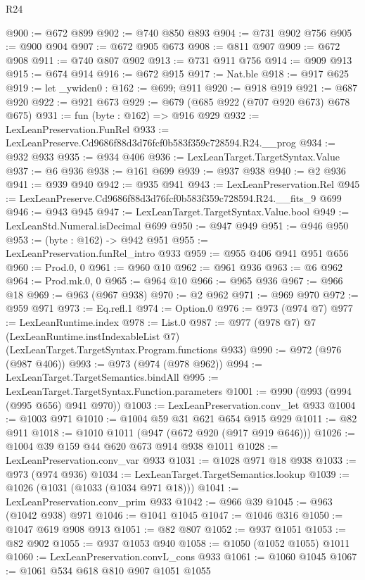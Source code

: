 \begin{lexlean}{R24}
\begin{coremodule}
@900 := @672 @899
@902 := @740 @850 @893
@904 := @731 @902 @756
@905 := @900 @904
@907 := @672 @905 @673
@908 := @811 @907
@909 := @672 @908
@911 := @740 @807 @902
@913 := @731 @911 @756
@914 := @909 @913
@915 := @674 @914
@916 := @672 @915
@917 := Nat.ble
@918 := @917 @625
@919 := let _ywiden0 : @162 := @699; @911
@920 := @918 @919
@921 := @687 @920
@922 := @921 @673
@929 := @679 (@685 @922 (@707 @920 @673) @678 @675)
@931 := fun (byte : @162) => @916 @929
@932 := LexLeanPreservation.FunRel
@933 := LexLeanPreserve.Cd9686f88d3d76fcf0b583f359c728594.R24.__prog
@934 := @932 @933
@935 := @934 @406
@936 := LexLeanTarget.TargetSyntax.Value
@937 := @6 @936
@938 := @161 @699
@939 := @937 @938
@940 := @2 @936
@941 := @939 @940
@942 := @935 @941
@943 := LexLeanPreservation.Rel
@945 := LexLeanPreserve.Cd9686f88d3d76fcf0b583f359c728594.R24.__fits_9 @699
@946 := @943 @945
@947 := LexLeanTarget.TargetSyntax.Value.bool
@949 := LexLeanStd.Numeral.isDecimal @699
@950 := @947 @949
@951 := @946 @950
@953 := (byte : @162) -> @942 @951
@955 := LexLeanPreservation.funRel_intro @933
@959 := @955 @406 @941 @951 @656
@960 := Prod.{0, 0}
@961 := @960 @10
@962 := @961 @936
@963 := @6 @962
@964 := Prod.mk.{0, 0}
@965 := @964 @10
@966 := @965 @936
@967 := @966 @18
@969 := @963 (@967 @938)
@970 := @2 @962
@971 := @969 @970
@972 := @959 @971
@973 := Eq.refl.{1}
@974 := Option.{0}
@976 := @973 (@974 @7)
@977 := LexLeanRuntime.index
@978 := List.{0}
@987 := @977
    (@978 @7)
    @7
    (LexLeanRuntime.instIndexableList @7)
    (LexLeanTarget.TargetSyntax.Program.functions @933)
@990 := @972 (@976 (@987 @406))
@993 := @973 (@974 (@978 @962))
@994 := LexLeanTarget.TargetSemantics.bindAll
@995 := LexLeanTarget.TargetSyntax.Function.parameters
@1001 := @990 (@993 (@994 (@995 @656) @941 @970))
@1003 := LexLeanPreservation.conv_let @933
@1004 := @1003 @971
@1010 := @1004 @59 @31 @621 @654 @915 @929
@1011 := @82 @911
@1018 := @1010 @1011 (@947 (@672 @920 (@917 @919 @646)))
@1026 := @1004 @39 @159 @44 @620 @673 @914 @938 @1011
@1028 := LexLeanPreservation.conv_var @933
@1031 := @1028 @971 @18 @938
@1033 := @973 (@974 @936)
@1034 := LexLeanTarget.TargetSemantics.lookup
@1039 := @1026 (@1031 (@1033 (@1034 @971 @18)))
@1041 := LexLeanPreservation.conv_prim @933
@1042 := @966 @39
@1045 := @963 (@1042 @938) @971
@1046 := @1041 @1045
@1047 := @1046 @316
@1050 := @1047 @619 @908 @913
@1051 := @82 @807
@1052 := @937 @1051
@1053 := @82 @902
@1055 := @937 @1053 @940
@1058 := @1050 (@1052 @1055) @1011
@1060 := LexLeanPreservation.convL_cons @933
@1061 := @1060 @1045
@1067 := @1061 @534 @618 @810 @907 @1051 @1055

\end{coremodule}
\end{lexlean}
